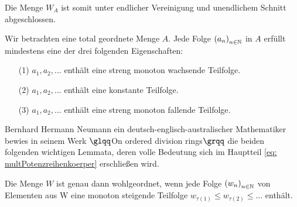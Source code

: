 %
%
%
%
% 
%
%
%
%
Die Menge $W_A$ ist somit unter endlicher Vereinigung und unendlichem Schnitt abgeschlossen.
\begin{lemma}\label{unendlicheFolgeEigenschaften}
Wir betrachten eine total geordnete Menge $A$. Jede Folge $\left(a_n\right)_{n \in \mathbb{N}}$ in $A$ erfüllt mindestens eine der drei folgenden Eigenschaften:
\begin{enumerate}
\item[(1)] $a_1, a_2, ...$ enthält eine streng monoton wachsende Teilfolge.
\item[(2)] $a_1, a_2, ...$ enthält eine konstante Teilfolge.
\item[(3)] $a_1, a_2, ...$ enthält eine streng monoton fallende Teilfolge.
\end{enumerate}
%
\end{lemma}
%
Bernhard Hermann Neumann ein deutsch-englisch-australischer Mathematiker bewies in seinem Werk $\glqq$On ordered division rings$\grqq$ \cite[S. 206]{neumann49} die beiden folgenden wichtigen Lemmata, deren volle Bedeutung sich im Hauptteil \ref{eq: multPotenzreihenkoerper} erschließen wird. 
\begin{lemma}\label{wohlgeordnetwennkeineabfallendeFolge} %
Die Menge $W$ ist genau dann wohlgeordnet, wenn jede Folge $\left(w_n\right)_{n\in\mathbb{N}}$ von Elementen aus W eine monoton steigende Teilfolge  $w_{\tau(1)} \le w_{\tau(2)} \le ...$ enthält.
\end{lemma}
